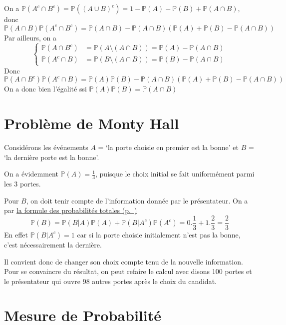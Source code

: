 \label{I-answer-ic-3}
On a
\(\mathbb{P}(A^c\cap B^c) = \mathbb{P}((A \cup B)^c) = 1 - \mathbb{P}(A) - \mathbb{P}(B) + \mathbb{P}(A\cap B)\),
donc
\[\mathbb{P}(A\cap B)\mathbb{P}(A^c \cap B^c) = \mathbb{P}(A\cap B) - \mathbb{P}(A\cap B)(\mathbb{P}(A) + \mathbb{P}(B) - \mathbb{P}(A\cap B))\]
Par ailleurs, on a \[\left\{ \begin{array}{ll}
        \mathbb{P}(A \cap B^c)  & = \mathbb{P}(A \setminus (A\cap B)) = \mathbb{P}(A) - \mathbb{P}(A\cap B) \\
        \mathbb{P}(A^c \cap B)  &=  \mathbb{P}(B \setminus (A\cap B)) = \mathbb{P}(B) - \mathbb{P}(A\cap B)
        \end{array}
        \right.\] Donc
\[ \mathbb{P}(A \cap B^c)\mathbb{P}(A^c\cap B) = \mathbb{P}(A)\mathbb{P}(B) -\mathbb{P}(A\cap B)(\mathbb{P}(A) + \mathbb{P}(B)- \mathbb{P}(A\cap B))\]
On a donc bien l'égalité ssi
\(\mathbb{P}(A)\mathbb{P}(B) = \mathbb{P}(A\cap B)\)

\section{Problème de Monty Hall}\label{I-answer-mh}

Considérons les événements \(A\) = `la porte choisie en premier est la
bonne' et \(B\) = `la dernière porte est la bonne'.

On a évidemment \(\mathbb{P}(A) = \frac{1}{3}\), puisque le choix
initial se fait uniformément parmi les 3 portes.

Pour \(B\), on doit tenir compte de l'information donnée par le
présentateur. On a par \protect\hyperref[I-formprobatot]{la formule des
probabilités totales (p.~\pageref*{I-formprobatot})}
\[\mathbb{P}(B) = \mathbb{P}(B|A)\mathbb{P}(A) + \mathbb{P}(B|A^c)\mathbb{P}(A^c) = 0.\frac{1}{3} + 1.\frac{2}{3} = \frac{2}{3}\]
En effet \(\mathbb{P}(B|A^c) = 1\) car si la porte choisie initialement
n'est pas la bonne, c'est nécessairement la dernière.

Il convient donc de changer son choix compte tenu de la nouvelle
information. Pour se convaincre du résultat, on peut refaire le calcul
avec disons 100 portes et le présentateur qui ouvre 98 autres portes
après le choix du candidat.

\section{Mesure de Probabilité}\label{I-mesure-de-probabilituxe9-1}


